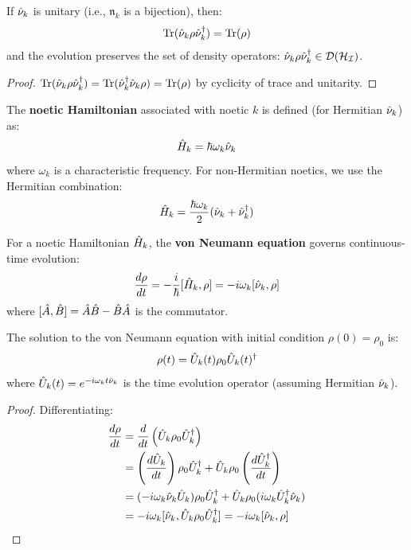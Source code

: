 \begin{proposition}
\label{prop:trace-preserve-unitary}
If $\hat{\nu}_k$ is unitary (i.e., $\mathfrak{n}_k$ is a bijection), then:
\[
\mathrm{Tr}(\hat{\nu}_k \rho \hat{\nu}_k^\dagger) = \mathrm{Tr}(\rho)
\]
and the evolution preserves the set of density operators: $\hat{\nu}_k \rho \hat{\nu}_k^\dagger \in \mathcal{D}(\mathcal{H}_{\mathcal{I}})$.
\end{proposition}

\begin{proof}
$\mathrm{Tr}(\hat{\nu}_k \rho \hat{\nu}_k^\dagger) = \mathrm{Tr}(\hat{\nu}_k^\dagger \hat{\nu}_k \rho) = \mathrm{Tr}(\rho)$ by cyclicity of trace and unitarity.
\end{proof}

\begin{definition}
\label{def:noetic-hamiltonian}
The \textbf{noetic Hamiltonian} associated with noetic $k$ is defined (for Hermitian $\hat{\nu}_k$) as:
\[
\hat{H}_k = \hbar \omega_k \hat{\nu}_k
\]
where $\omega_k$ is a characteristic frequency. For non-Hermitian noetics, we use the Hermitian combination:
\[
\hat{H}_k = \frac{\hbar \omega_k}{2}(\hat{\nu}_k + \hat{\nu}_k^\dagger)
\]
\end{definition}

\begin{definition}
\label{def:von-neumann-equation}
For a noetic Hamiltonian $\hat{H}_k$, the \textbf{von Neumann equation} governs continuous-time evolution:
\[
\frac{d\rho}{dt} = -\frac{i}{\hbar}[\hat{H}_k, \rho] = -i\omega_k[\hat{\nu}_k, \rho]
\]
where $[\hat{A}, \hat{B}] = \hat{A}\hat{B} - \hat{B}\hat{A}$ is the commutator.
\end{definition}

\begin{theorem}
\label{thm:von-neumann-solution}
The solution to the von Neumann equation with initial condition $\rho(0) = \rho_0$ is:
\[
\rho(t) = \hat{U}_k(t) \rho_0 \hat{U}_k(t)^\dagger
\]
where $\hat{U}_k(t) = e^{-i\omega_k t \hat{\nu}_k}$ is the time evolution operator (assuming Hermitian $\hat{\nu}_k$).
\end{theorem}

\begin{proof}
Differentiating:
\begin{align}
\frac{d\rho}{dt} &= \frac{d}{dt}\left(\hat{U}_k \rho_0 \hat{U}_k^\dagger\right) \\
&= \left(\frac{d\hat{U}_k}{dt}\right) \rho_0 \hat{U}_k^\dagger + \hat{U}_k \rho_0 \left(\frac{d\hat{U}_k^\dagger}{dt}\right) \\
&= (-i\omega_k \hat{\nu}_k \hat{U}_k) \rho_0 \hat{U}_k^\dagger + \hat{U}_k \rho_0 (i\omega_k \hat{U}_k^\dagger \hat{\nu}_k) \\
&= -i\omega_k[\hat{\nu}_k, \hat{U}_k \rho_0 \hat{U}_k^\dagger] = -i\omega_k[\hat{\nu}_k, \rho]
\end{align}
\end{proof}

